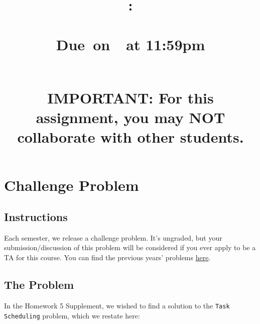 \documentclass{article}
\title{
    \vspace{2in}
    \textbf{\hmwkClass:\\ \hmwkTitle} \\
    \normalsize\vspace{0.1in}\small{Due\ on\ \hmwkDueDate\ at 11:59pm} \\
    \vspace{0.1in}\large{\textit{\hmwkClassInstructor\ \hmwkSection}} \\
    \vspace{1in}
    \begin{minipage}[t]{0.5\columnwidth}
    {\footnotesize \textbf{IMPORTANT:} For this assignment, you may NOT collaborate with other students.}
    \end{minipage}
    \vspace{1in}
    \author{\textbf{\hmwkAuthorName}}
    \date{}
}
\begin{document}
\maketitle
\pagebreak


\section*{Challenge Problem}
    \subsection*{Instructions}
    Each semester, we release a challenge problem. It's ungraded, but your submission/discussion of this problem will be considered if you ever apply to be a TA for this course. You can find the previous years' problems \href{https://github.com/sar-mo/CS2051-HonorsDiscreteMath/blob/main/sp22/extra-credit/Exam 2 Extra Credit.pdf}{here}. 

    \subsection*{The Problem}
    In the Homework 5 Supplement, we wished to find a solution to the \texttt{Task} \texttt{Scheduling} problem, which we restate here:
\end{document}
